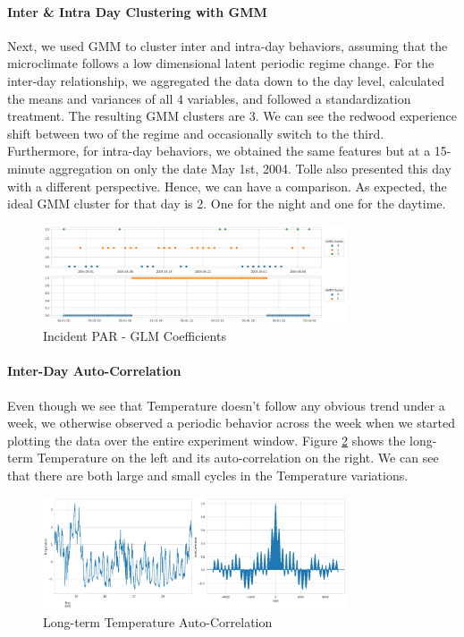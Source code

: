 \documentclass[11pt, letterpaper]{article}
\begin{document}
\paragraph{Inter \& Intra Day Clustering with GMM}
Next, we used GMM to cluster inter and intra-day behaviors, assuming that the microclimate follows a low dimensional latent periodic regime change. For the inter-day relationship, we aggregated the data down to the day level, calculated the means and variances of all 4 variables, and followed a standardization treatment. The resulting GMM clusters are 3. We can see the redwood experience shift between two of the regime and occasionally switch to the third. Furthermore, for intra-day behaviors, we obtained the same features but at a 15-minute aggregation on only the date May 1st, 2004. Tolle also presented this day with a different perspective. Hence, we can have a comparison. As expected, the ideal GMM cluster for that day is 2. One for the night and one for the daytime.
\begin{figure}[h!]
\centering
\includegraphics[width=0.8\textwidth]{if_4.3.png}
\captionsetup{justification=centering}
\caption{Incident PAR - GLM Coefficients}
\label{fig:glm_coef}
\end{figure}

\paragraph{Inter-Day Auto-Correlation}
Even though we see that Temperature doesn't follow any obvious trend under a week, we otherwise observed a periodic behavior across the week when we started plotting the data over the entire experiment window. Figure \ref{fig:temp_autocor} shows the long-term Temperature on the left and its auto-correlation on the right. We can see that there are both large and small cycles in the Temperature variations.
\begin{figure}[h!]
\centering
\includegraphics[width=0.8\textwidth]{if_4.4.png}
\captionsetup{justification=centering}
\caption{Long-term Temperature Auto-Correlation}
\label{fig:temp_autocor}
\end{figure}
\end{document}

